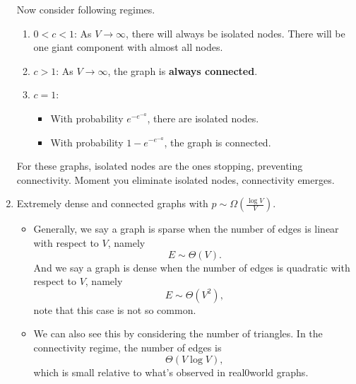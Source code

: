 \begin{enumerate}
	      Now consider following regimes.
	      \begin{enumerate}
		      \item \(0<c<1\): As \(V\to \infty \), there will always be isolated nodes. There will be one giant component with almost all nodes.
		      \item \(c>1\): As \(V\to \infty \), the graph is \textbf{always connected}.
		      \item \(c = 1\):
		            \begin{itemize}
			            \item With probability \(e^{-e^{-a}}\), there are isolated nodes.
			            \item With probability \(1 - e^{-e^{-a}}\), the graph is connected.
		            \end{itemize}
	      \end{enumerate}
	      \begin{remark}
		      For these graphs, isolated nodes are the ones stopping, preventing connectivity. Moment you eliminate isolated nodes,
		      connectivity emerges.
	      \end{remark}
	\item Extremely dense and connected graphs with \(p\sim \Omega(\frac{\log V}{V})\).
	      \begin{remark}
		      \begin{itemize}
			      \item Generally, we say a graph is sparse when the number of edges is linear with respect to \(V\), namely
			            \[
				            E\sim \Theta(V).
			            \]
			            And we say a graph is dense when the number of edges is quadratic with respect to \(V\), namely
			            \[
				            E\sim \Theta(V^2),
			            \]
			            note that this case is not so common.
			      \item We can also see this by considering the number of triangles. In the connectivity regime, the number of edges is
			            \[
				            \Theta(V\log V),
			            \]
			            which is small relative to what's observed in real0world graphs.
		      \end{itemize}
	      \end{remark}
\end{enumerate}
